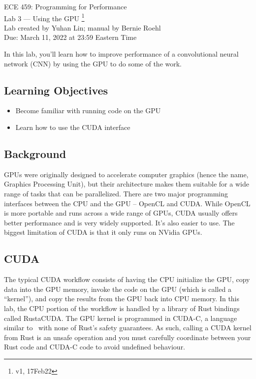



\begin{center}
{\Large ECE 459: Programming for Performance}\\
{\Large Lab 3 --- Using the GPU \footnote{v1, 17Feb22}}\\[1em]
Lab created by Yuhan Lin; manual by Bernie Roehl\\
Due: March 11, 2022 at 23:59 Eastern Time
\end{center}

In this lab, you'll learn how to improve performance of a convolutional neural network (CNN) by using the GPU to do some of the work.


\subsection*{Learning Objectives}

\begin{itemize}
	\item Become familiar with running code on the GPU

	\item Learn how to use the CUDA interface
\end{itemize}

\subsection*{Background}

GPUs were originally designed to accelerate computer graphics (hence the name, Graphics Processing Unit), but their architecture makes them suitable for a wide range of tasks that can be parallelized. There are two major programming interfaces between the CPU and the GPU -- OpenCL and CUDA. While OpenCL is more portable and runs across a wide range of GPUs, CUDA usually offers better performance and is very widely supported. It's also easier to use. The biggest limitation of CUDA is that it only runs on NVidia GPUs.

\subsection*{CUDA}

The typical CUDA workflow consists of having the CPU initialize the GPU, copy data into the GPU memory, invoke the code on the GPU (which is called a ``kernel''), and copy the results from the GPU back into CPU memory. In this lab, the CPU portion of the workflow is handled by a library of Rust bindings called RustaCUDA. The GPU kernel is programmed in CUDA-C, a language similar to \CPP~with none of Rust's safety guarantees. As such, calling a CUDA kernel from Rust is an unsafe operation and you must carefully coordinate between your Rust code and CUDA-C code to avoid undefined behaviour.

